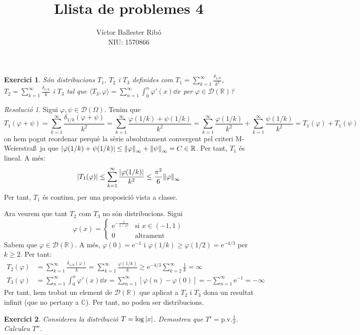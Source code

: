 \documentclass[10pt,a4paper]{article}
\title{\bfseries\Large Llista de problemes 4}
\author{Víctor Ballester Ribó\\NIU: 1570866}
\date{\parbox{\linewidth}{\centering
  Anàlisi Harmònica\endgraf
  Grau en Matemàtiques\endgraf
  Universitat Autònoma de Barcelona\endgraf
  Abril de 2023}}
\newcommand{\RR}{\ensuremath{\mathbb{R}}} %
\newcommand{\CC}{\ensuremath{\mathbb{C}}} %
\newtheorem{exercici}{Exercici}
\theoremstyle{definition}
\theoremstyle{remark}
\newtheorem*{res}{Resolució}
\renewcommand{\pv}{\mathrm{p.v.}} %
\renewcommand{\exp}[1]{\mathrm{e}^{#1}} %
\begin{document}
\maketitle
\begin{exercici}
  Són distribucions $T_1$, $T_2$ i $T_3$ definides com $T_1=\sum_{k=1}^\infty \frac{\delta_{1/k}}{k^2}$, $T_2=\sum_{k=1}^\infty \frac{\delta_{1/k}}{k}$ i $T_3$ tal que $\langle T_3,\varphi\rangle=\sum_{n=1}^\infty\int_0^n \varphi'(x)\dd{x}$ per $\varphi\in\mathcal{D}(\RR)$?
\end{exercici}
\begin{res}
  Sigui $\varphi,\psi\in\mathcal{D}(\Omega)$. Tenim que
  $$T_1(\varphi+\psi)=\sum_{k=1}^\infty \frac{\delta_{1/k}(\varphi+\psi)}{k^2}=\sum_{k=1}^\infty \frac{\varphi(1/k)+\psi(1/k)}{k^2}=\sum_{k=1}^\infty \frac{\varphi(1/k)}{k^2}+\sum_{k=1}^\infty \frac{\psi(1/k)}{k^2}=T_1(\varphi)+T_1(\psi)$$
  on hem pogut reordenar perquè la sèrie absolutament convergent pel criteri M-Weierstra\ss\ ja que $\abs{\varphi(1/k)+\psi(1/k)}\leq \norm{\varphi}_\infty+\norm{\psi}_\infty=C\in\RR$. Per tant, $T_1$ és lineal. A més:
  $$
    \abs{T_1(\varphi)}\leq \sum_{k=1}^\infty \frac{\abs{\varphi(1/k)}}{k^2}\leq \frac{\pi^2}{6}\norm{\varphi}_\infty
  $$
  Per tant, $T_1$ és continu, per una proposició vista a classe.

  Ara veurem que tant $T_2$ com $T_3$ no són distribucions. Sigui
  $$
    \varphi(x)=\begin{cases}
      \exp{-\frac{1}{1-x^2}} & \text{si } x\in(-1,1) \\
      0                      & \text{altrament}
    \end{cases}
  $$
  Sabem que $\varphi\in\mathcal{D}(\RR)$. A més, $\varphi(0)=\exp{-1}$ i $\varphi(1/k)\geq \varphi(1/2) = \exp{-4/3}$ per $k\geq 2$. Per tant:
  \begin{align*}
    T_2(\varphi) & =\sum_{k=1}^{\infty}\frac{\delta_{1/k}(\varphi)}{k}=\sum_{k=1}^{\infty}\frac{\varphi(1/k)}{k}\geq\exp{-4/3}\sum_{k=2}^{\infty}\frac{1}{k}=\infty \\
    T_3(\varphi) & =\sum_{n=1}^{\infty}\int_0^n \varphi'(x)\dd{x}=\sum_{n=1}^{\infty}[\varphi(n)-\varphi(0)]=-\sum_{n=1}^{\infty}\exp{-1}=-\infty
  \end{align*}
  Per tant, hem trobat un element de $\mathcal{D}(\RR)$ que aplicat a $T_2$ i $T_3$ dona un resultat infinit (que no pertany a $\CC$). Per tant, no poden ser distribucions.
\end{res}
\begin{exercici}
  Considereu la distribució $T=\log\abs{x}$. Demostreu que $T'=\pv\frac{1}{x}$. Calculeu $T''$.
\end{exercici}
\end{document}
